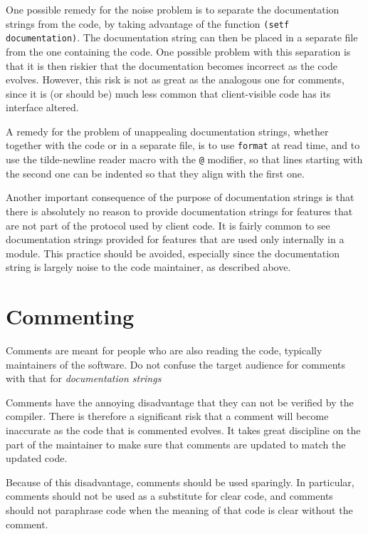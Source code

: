One possible remedy for the noise problem is to separate the
documentation strings from the code, by taking advantage of the
function \texttt{(setf documentation)}.  The documentation string can
then be placed in a separate file from the one containing the code.
One possible problem with this separation is that it is then riskier
that the documentation becomes incorrect as the code evolves.
However, this risk is not as great as the analogous one for comments,
since it is (or should be) much less common that client-visible code
has its interface altered.

A remedy for the problem of unappealing documentation strings, whether
together with the code or in a separate file, is to use
\texttt{format} at read time, and to use the tilde-newline reader
macro with the \texttt{@} modifier, so that lines starting with the
second one can be indented so that they align with the first one.

Another important consequence of the purpose of documentation strings
is that there is absolutely no reason to provide documentation strings
for features that are not part of the protocol used by client code.
It is fairly common to see documentation strings provided for features
that are used only internally in a module.  This practice should be
avoided, especially since the documentation string is largely noise to
the code maintainer, as described above.

\section{Commenting}
\label{sec-general-coding-style-commenting}

Comments are meant for people who are also reading the code, typically
maintainers of the software.  Do not confuse the target audience for
comments with that for \emph{documentation strings}

Comments have the annoying disadvantage that they can not be verified
by the compiler.  There is therefore a significant risk that a comment
will become inaccurate as the code that is commented evolves.  It
takes great discipline on the part of the maintainer to make sure that
comments are updated to match the updated code.

Because of this disadvantage, comments should be used sparingly.  In
particular, comments should not be used as a substitute for clear
code, and comments should not paraphrase code when the meaning of that
code is clear without the comment.

